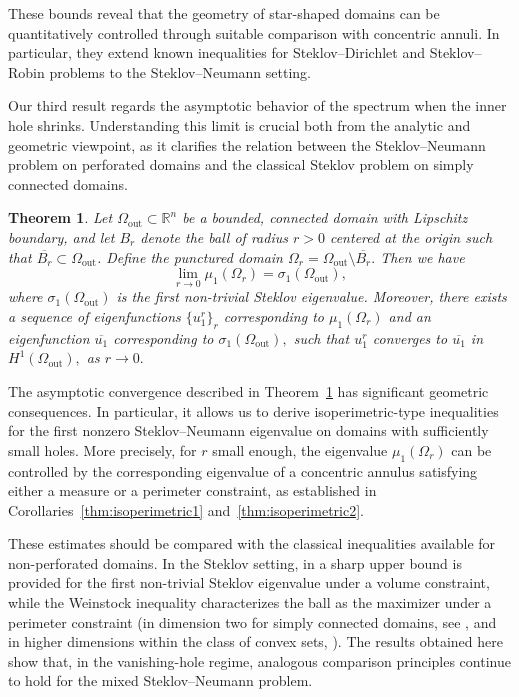 \documentclass[12pt,reqno]{amsart}
\newtheorem{theorem}{Theorem}[section]
\numberwithin{equation}{section}
\numberwithin{theorem}{section}
\numberwithin{equation}{section}
\numberwithin{theorem}{section}
\begin{document}
These bounds reveal that the geometry of star-shaped domains can be
quantitatively controlled through suitable comparison with concentric
annuli. In particular, they extend known inequalities for
Steklov--Dirichlet and Steklov--Robin problems to the
Steklov--Neumann setting.


 Our third result regards the asymptotic behavior of the spectrum when the
inner hole shrinks. Understanding this limit is crucial both from the
analytic and geometric viewpoint, as it clarifies the relation between the
Steklov--Neumann problem on perforated domains and the classical Steklov
problem on simply connected domains.

\begin{theorem}\label{thm:convergence}
Let $\Omega_{\mathrm{out}} \subset \mathbb{R}^n$ be a bounded, connected domain with Lipschitz boundary, and let $B_r$ denote the ball of radius $r>0$ centered at the origin such that $\overline{B_r} \subset \Omega_{\mathrm{out}}$.  
Define the punctured domain
$\Omega_r = \Omega_{\mathrm{out}} \setminus \overline{B_r}.$
Then we have 
$$
\lim_{r\to 0}\mu_1(\Omega_r) = \sigma_1(\Omega_{\mathrm{out}}),
$$
where $\sigma_1(\Omega_{\mathrm{out}})$ is the first non-trivial Steklov eigenvalue. Moreover, there exists a sequence of eigenfunctions $\{u_1^r\}_r$ corresponding to $\mu_1(\Omega_r)$ and an eigenfunction $\overline{u_1}$ corresponding to $\sigma_1(\Omega_{\mathrm{out}}),$ such that $u_1^r$ converges to $\overline{u_1}$ in $H^1(\Omega_{\mathrm{out}}),$ as $r\to 0.$ 
\end{theorem}

The asymptotic convergence described in
Theorem~\ref{thm:convergence} has significant geometric consequences.
In particular, it allows us to derive isoperimetric-type inequalities for
the first nonzero Steklov--Neumann eigenvalue on domains with sufficiently small
holes. More precisely, for $r$ small enough, the eigenvalue
$\mu_1(\Omega_r)$ can be controlled by the corresponding eigenvalue of a
concentric annulus satisfying either a measure or a perimeter constraint,
as established in Corollaries~\ref{thm:isoperimetric1}
and~\ref{thm:isoperimetric2}.

These estimates should be compared with the classical inequalities
available for non-perforated domains. In the Steklov setting, in \cite{Bro2001} a sharp upper bound is provided for the first non-trivial Steklov
eigenvalue under a volume constraint, while the Weinstock inequality
characterizes the ball as the maximizer under a perimeter constraint
(in dimension two for simply connected domains, see \cite{Wein1954}, and in higher dimensions
within the class of convex sets, \cite{BFNT2021}). The results obtained here show that,
in the vanishing-hole regime, analogous comparison principles continue to
hold for the mixed Steklov--Neumann problem.
\end{document}
